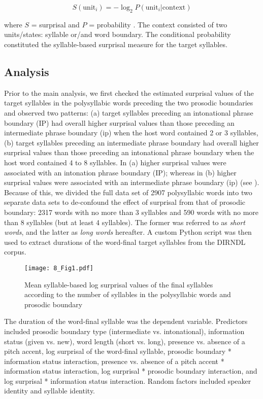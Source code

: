 \documentclass[output=paper,colorlinks,citecolor=brown]{langscibook}
\begin{document}
\begin{equation}
S(\text{unit}_{i}) = - \log_{2} P(\text{unit}_{i} | \text{context})
\end{equation}

where $S$ = surprisal and $P$ = probability \citep{Hale2016}. The context consisted of two units\slash states: syllable or\slash and word boundary. The conditional probability constituted the syllable-based surprisal measure for the target syllables.

\subsection{Analysis}
 Prior to the main analysis, we first checked the estimated surprisal values of the target syllables in the polysyllabic words preceding the two prosodic boundaries and observed two patterns: (a) target syllables preceding an intonational phrase boundary (IP) had overall higher surprisal values than those preceding an intermediate phrase boundary (ip) when the host word contained 2 or 3 syllables, (b) target syllables preceding an intermediate phrase boundary had overall higher surprisal values than those preceding an intonational phrase boundary when the host word contained 4 to 8 syllables. In (a) higher surprisal values were associated with an intonation phrase boundary (IP); whereas in (b) higher surprisal values were associated with an intermediate phrase boundary (ip) (see ). 
 Because of this, we divided the full data set of 2907 polysyllabic words into two separate data sets to de-confound the effect of surprisal from that of prosodic boundary: 2317 words with no more than 3 syllables and 590 words with no more than 8 syllables (but at least 4 syllables). The former was referred to as \textit{short words}, and the latter as \textit{long words} hereafter. A custom Python script was then used to extract durations of the word-final target syllables from the DIRNDL corpus.

\begin{figure}
\texttt{[image: 8\_Fig1.pdf]}
\caption{Mean syllable-based log surprisal values of the final syllables according to the number of syllables in the polysyllabic words and prosodic boundary}
\label{fig1}
\end{figure}

The duration of the word-final syllable was the dependent variable. Predictors included prosodic boundary type (intermediate vs. intonational), information status (given vs. new), word length (short vs. long), presence vs. absence of a pitch accent, log surprisal of the word-final syllable, prosodic boundary * information status interaction, presence vs. absence of a pitch accent * information status interaction, log surprisal * prosodic boundary interaction, and log surprisal * information status interaction. Random factors included speaker identity and syllable identity.
\end{document}

